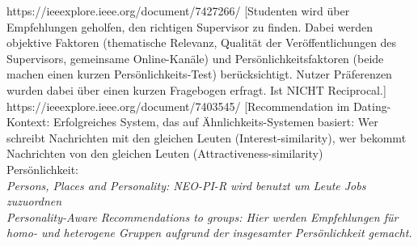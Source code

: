 \documentclass[nochapterpage,bigchapter,linedtoc,longdoc,colorback,accentcolor=tud3b]{tudreport}
\begin{document}
https://ieeexplore.ieee.org/document/7427266/ [Studenten wird über Empfehlungen geholfen, den richtigen Supervisor zu finden. Dabei werden objektive Faktoren (thematische Relevanz, Qualität der Veröffentlichungen des Supervisors, gemeinsame Online-Kanäle) und Persönlichkeitsfaktoren (beide machen einen kurzen Persönlichkeits-Test) berücksichtigt. Nutzer Präferenzen wurden dabei über einen kurzen Fragebogen erfragt. Ist NICHT Reciprocal.]\cite{zhang2016personality}\\

https://ieeexplore.ieee.org/document/7403545/  [Recommendation im Dating-Kontext: Erfolgreiches System, das auf Ähnlichkeits-Systemen basiert: Wer schreibt Nachrichten mit den gleichen Leuten (Interest-similarity), wer bekommt Nachrichten von den gleichen Leuten (Attractiveness-similarity) \cite{xia2015reciprocal}\\

Persönlichkeit:\\

\textit{Persons, Places and Personality: NEO-PI-R wird benutzt um Leute Jobs zuzuordnen \cite{costa1995persons}}\\

\textit{Personality-Aware Recommendations to groups: Hier werden Empfehlungen für homo- und heterogene Gruppen aufgrund der insgesamter Persönlichkeit gemacht. \cite{recio2009personality}}\\





\end{document}
